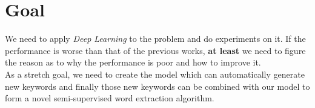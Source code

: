 \documentclass[dvips,12pt]{article}
\begin{document}
	\section{Goal}
	We need to apply \emph{Deep Learning} to the problem and do experiments on it. If the performance is worse than that of the previous works, \textbf{at least} we need to figure the reason as to why the performance is poor and how to improve it. \\
	As a stretch goal, we need to create the model which can automatically generate new keywords and finally those new keywords can be combined with our model to form a novel semi-supervised word extraction algorithm.
\end{document}
